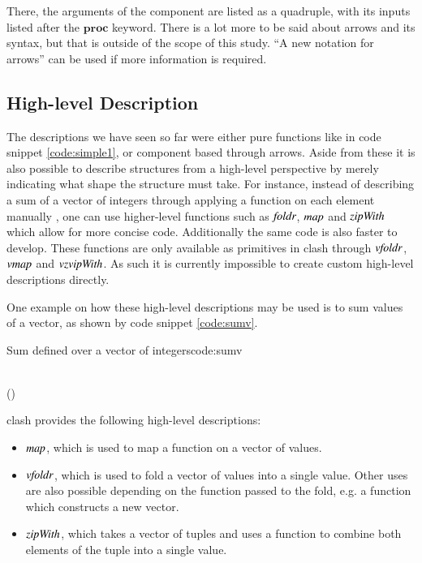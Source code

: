 There, the arguments of the component are listed as a quadruple, with its inputs listed after the \ensuremath{\textbf{proc}} keyword.
There is a lot more to be said about arrows and its syntax, but that is outside of the scope of this study.
``A new notation for arrows''\cite{paterson2001new} can be used if more information is required.

\subsection{High-level Description}
The descriptions we have seen so far were either pure functions like in code snippet \ref{code:simple1}, or component based through arrows.
Aside from these it is also possible to describe structures from a high-level perspective by merely indicating what shape the structure must take.
For instance, instead of describing a sum of a vector of integers through applying a function on each element manually , one can use higher-level functions such as \ensuremath{\Varid{foldr}}, \ensuremath{\Varid{map}} and \ensuremath{\Varid{zipWith}} which allow for more concise code. 
Additionally the same code is also faster to develop.
These functions are only available as primitives in \gls{clash} through \ensuremath{\Varid{vfoldr}},\ensuremath{\Varid{vmap}} and \ensuremath{\Varid{vzvipWith}}.
As such it is currently impossible to create custom high-level descriptions directly.

One example on how these high-level descriptions may be used is to sum values of a vector, as shown by code snippet \ref{code:sumv}.

\begin{texexptitled}{Sum defined over a vector of integers}{code:sumv}
\begin{hscode}\SaveRestoreHook
{}%
%
\>[B]{}\mathbin{::}\;\;\to {}\<[E]%
\\
\>[B]{}\mathrel{=}\;(\mathbin{+})\;\<[E]%
\ColumnHook
\end{hscode}\resethooks
\end{texexptitled}

\gls{clash} provides the following high-level descriptions:
\begin{itemize}
 \item \ensuremath{\Varid{map}}, which is used to map a function on a vector of values.
 \item \ensuremath{\Varid{vfoldr}}, which is used to fold a vector of values into a single value. Other uses are also possible depending on the function passed to the fold, e.g. a function which constructs a new vector.
 \item \ensuremath{\Varid{zipWith}}, which takes a vector of tuples and uses a function to combine both elements of the tuple into a single value. 
\end{itemize}

